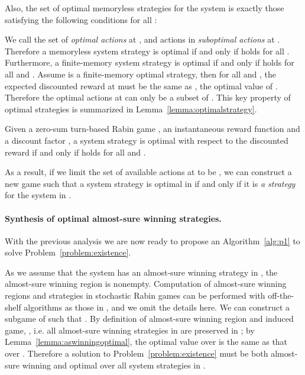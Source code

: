 \documentclass[runningheads,a4paper]{llncs}
\begin{document}
Also, the set of optimal memoryless strategies for the system is exactly those  satisfying the following conditions for all  \cite{filar1996competitive}: 

We call  the set of \emph{optimal actions} at , and actions in  \emph{suboptimal actions} at . Therefore a memoryless system strategy  is optimal if and only if  holds for all . Furthermore, a finite-memory system strategy  is optimal if and only if  holds for all  and . Assume  is a finite-memory optimal strategy, then for all  and , the expected discounted reward at  must be the same as , the optimal value of . Therefore the optimal actions at  can only be a subset of . This key property of optimal strategies is summarized in Lemma~\ref{lemma:optimalstrategy}.

\begin{lemma}
Given a zero-sum turn-based Rabin game , an instantaneous reward function  and a discount factor , a system strategy  is optimal with respect to the discounted reward if and only if  holds for all  and . 
\label{lemma:optimalstrategy}
\end{lemma}

As a result, if we limit the set of available actions at  to be , we can construct a new game  such that a system strategy  is optimal in  if and only if it is \emph{a strategy} for the system in . 

\paragraph{Synthesis of optimal almost-sure winning strategies.} With the previous analysis we are now ready to propose an Algorithm~\ref{alg:p1} to solve Problem~\ref{problem:existence}. 




As we assume that the system has an almost-sure winning strategy in , the almost-sure winning region  is nonempty. Computation of almost-sure winning regions and strategies in stochastic Rabin games can be performed with off-the-shelf algorithms as those in \cite{chatterjee2005complexity, chatterjee2006strategy}, and we omit the details here. 
We can construct a subgame  of  such that . By definition of almost-sure winning region and induced game, , i.e. all almost-sure winning strategies in  are preserved in ; by Lemma~\ref{lemma:aswinningoptimal}, the optimal value over  is the same as that over . 
Therefore a solution to Problem~\ref{problem:existence} must be both almost-sure winning and optimal over all system strategies in . 
\end{document}
